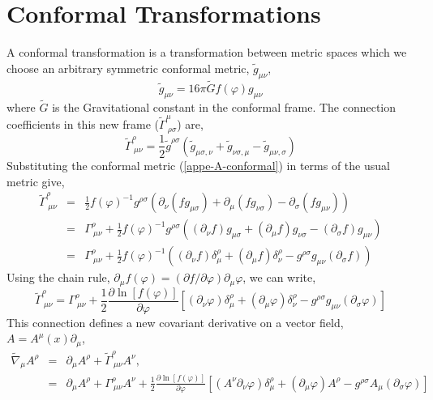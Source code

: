 \chapter{Conformal Transformations}\label{appendixConformalTrans}
A conformal transformation is a transformation between metric spaces which we choose an arbitrary symmetric conformal metric, $\tilde{g}_{\mu\nu}$, 
\begin{equation}\label{appe-A-conformal}
    \tilde{g}_{\mu\nu} = 16\pi\tilde{G}f(\varphi)g_{\mu\nu}
\end{equation}
where $\tilde{G}$ is the Gravitational constant in the conformal frame. The connection coefficients in this new frame ($\tilde{\Gamma}^{\mu}_{\ \rho\sigma}$) are, 
\begin{equation}
    \tilde{\Gamma}^{\rho}_{\ \mu\nu} = \frac{1}{2}\tilde{g}^{\rho\sigma}\left(\tilde{g}_{\mu\sigma, \nu} + \tilde{g}_{\nu\sigma, \mu} - \tilde{g}_{\mu\nu, \sigma}  \right)
\end{equation}
Substituting the conformal metric (\ref{appe-A-conformal}) in terms of the usual metric give, 
\begin{eqnarray}
    \tilde{\Gamma}^{\rho}_{\ \mu\nu} &=& \frac{1}{2}f(\varphi)^{-1}g^{\rho\sigma}\left(\partial_{\nu}(fg_{\mu\sigma}) + \partial_{\mu}(fg_{\nu\sigma})- \partial_{\sigma}(fg_{\mu\nu}) \right)\\
    &=& \Gamma^{\rho}_{\ \mu\nu} + \frac{1}{2}f(\varphi)^{-1}g^{\rho\sigma}\left((\partial_{\nu}f)g_{\mu\sigma} + (\partial_{\mu}f)g_{\nu\sigma} -(\partial_{\sigma}f)g_{\mu\nu} \right)\\
    &=& \Gamma^{\rho}_{\ \mu\nu} + \frac{1}{2}f(\varphi)^{-1}\left((\partial_{\nu}f)\delta^{\rho}_{\mu} + (\partial_{\mu}f)\delta^{\rho}_{\nu} -g^{\rho\sigma}g_{\mu\nu}(\partial_{\sigma}f)\right)
\end{eqnarray}
Using the chain rule, $\partial_{\mu}f(\varphi) = (\partial f/\partial \varphi)\partial_{\mu}\varphi$, we can write, 
\begin{equation}
    \tilde{\Gamma}^{\rho}_{\ \mu\nu} = \Gamma^{\rho}_{\ \mu\nu} + \frac{1}{2}\frac{\partial \ln[f(\varphi)]}{\partial \varphi}\left[(\partial_{\nu}\varphi)\delta^{\rho}_{\mu} + (\partial_{\mu}\varphi)\delta^{\rho}_{\nu} -g^{\rho\sigma}g_{\mu\nu}(\partial_{\sigma}\varphi)\right]
\end{equation}
This connection defines a new covariant derivative on a vector field, $A = A^{\mu}(x)\partial_{\mu}$, 
\begin{eqnarray*}
\tilde{\nabla}_{\mu}A^{\rho} &=& \partial_{\mu}A^{\rho} + \tilde{\Gamma}^{\rho}_{\ \mu\nu}A^{\nu},\\
&=& \partial_{\mu}A^{\rho} + \Gamma^{\rho}_{\ \mu\nu}A^{\nu} + \frac{1}{2}\frac{\partial \ln[f(\varphi)]}{\partial \varphi}\left[(A^{\nu}\partial_{\nu}\varphi)\delta^{\rho}_{\mu} + (\partial_{\mu}\varphi)A^{\rho} -g^{\rho\sigma}A_{\mu}(\partial_{\sigma}\varphi)\right]
\end{eqnarray*}
